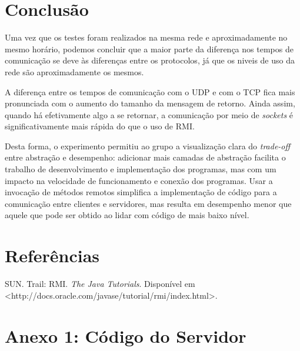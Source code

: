 \documentclass[11pt, brazil]{article} %
\begin{document}
\section{Conclusão}

Uma vez que os testes foram realizados na mesma rede e aproximadamente no mesmo horário, podemos concluir que a maior parte da diferença nos tempos de comunicação se deve às diferenças entre os protocolos, já que os niveis de uso da rede são aproximadamente os mesmos.

A diferença entre os tempos de comunicação com o UDP e com o TCP fica mais pronunciada com o aumento do tamanho da mensagem de retorno. Ainda assim, quando há efetivamente algo a se retornar, a comunicação por meio de \emph{sockets} é significativamente mais rápida do que o uso de RMI.

Desta forma, o experimento permitiu ao grupo a visualização clara do \emph{trade-off} entre abstração e desempenho: adicionar mais camadas de abstração facilita o trabalho de desenvolvimento e implementação dos programas, mas com um impacto na velocidade de funcionamento e conexão dos programas. Usar a invocação de métodos remotos simplifica a implementação de código para a comunicação entre clientes e servidores, mas resulta em desempenho menor que aquele que pode ser obtido ao lidar com código de mais baixo nível.


\section{Referências}

SUN. Trail: RMI. \emph{The Java Tutorials}. Disponível em <http://docs.oracle.com/javase/tutorial/rmi/index.html>.

\section*{Anexo 1: Código do Servidor}
\end{document}
